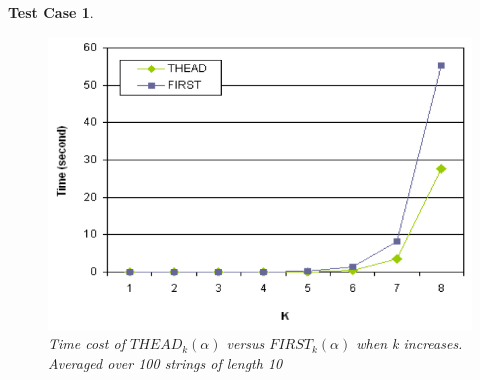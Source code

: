 \documentclass{sig-alternate-05-2015}
\newtheorem{TestCase}{Test Case}
\begin{document}
\begin{TestCase}
\begin{figure}[h]
\centering
\includegraphics[scale=0.5]{figure5.PNG}
\caption{Time cost of $THEAD_k(\alpha)$ versus $FIRST_k(\alpha)$
when k increases. Averaged over 100 strings of length 10}
\label{fig:5}
\end{figure}
\end{TestCase}
\end{document}
